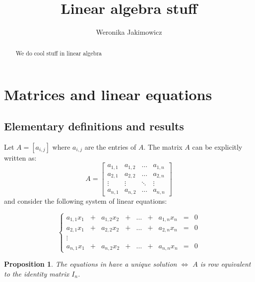\documentclass{article}
\title{Linear algebra stuff}
\author{Weronika Jakimowicz}
\newtheorem{proposition}{Proposition}[section]
\begin{document}
\maketitle
\begin{abstract}
We do cool stuff in linear algebra
\end{abstract}

\section{Matrices and linear equations}
\subsection{Elementary definitions and results}
Let $A=[a_{i,j}]$ where $a_{i,j}$ are the entries of $A$. The matrix $A$ can be explicitly written as:
$$
A=\begin{bmatrix}a_{1,1}&a_{1,2}&\dots&a_{1,n}\\
a_{2,1}&a_{2,2}&\dots&a_{2,n}\\
\vdots&\vdots&\ddots&\vdots\\
a_{n,1}&a_{n,2}&\dots&a_{n,n}
\end{bmatrix}
$$
and consider the following system of linear equations:

\begin{equation}\label{eq:1}
\left\{\begin{matrix}
a_{1,1}x_1&+&a_{1,2}x_2&+&\dots&+&a_{1,n}x_n&=&0\\
a_{2,1}x_1&+&a_{2,2}x_2&+&\dots&+&a_{2,n}x_n&=&0\\
\vdots &\\
a_{n,1}x_1&+&a_{n,2}x_2&+&\dots&+&a_{n,n}x_n&=&0
\end{matrix}\right.
\end{equation}

\begin{proposition}\label{prop:1}
The equations in  have a unique solution $\iff$ $A$ is row equivalent to the identity matrix $I_n$.
\end{proposition}
\end{document}
